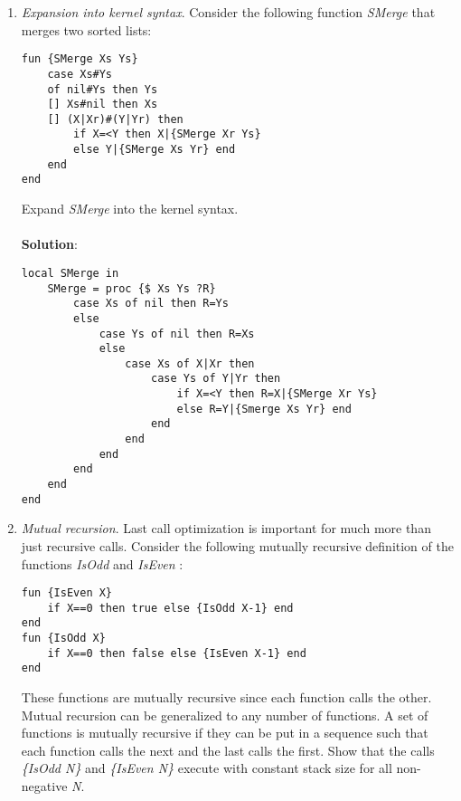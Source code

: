 \documentclass[11pt]{article}
\begin{document}
\begin{enumerate}
(c)
\\\\
\{Sum1 100000000\}: \\ stack grows with every recursive call, will exhaust allowed memory

\{Sum2 100000000 0\}: \\ tail recursion, constant stack, will return result

\item {\itshape Expansion into kernel syntax}. Consider the following function {\itshape SMerge} that
merges two sorted lists:
\begin{verbatim}
fun {SMerge Xs Ys}
    case Xs#Ys
    of nil#Ys then Ys
    [] Xs#nil then Xs
    [] (X|Xr)#(Y|Yr) then
        if X=<Y then X|{SMerge Xr Ys}
        else Y|{SMerge Xs Yr} end
    end
end        
\end{verbatim}
Expand {\itshape SMerge} into the kernel syntax.
\\\\
{\bfseries Solution}:
\begin{verbatim}
local SMerge in
    SMerge = proc {$ Xs Ys ?R}
        case Xs of nil then R=Ys
        else
            case Ys of nil then R=Xs
            else
                case Xs of X|Xr then
                    case Ys of Y|Yr then
                        if X=<Y then R=X|{SMerge Xr Ys}
                        else R=Y|{Smerge Xs Yr} end
                    end
                end
            end
        end
    end    
end                
\end{verbatim}

\item {\itshape Mutual recursion}. Last call optimization is important for much more than just
recursive calls. Consider the following mutually recursive deﬁnition of the functions
{\itshape IsOdd} and {\itshape IsEven} :
\begin{verbatim}
fun {IsEven X}
    if X==0 then true else {IsOdd X-1} end
end    
fun {IsOdd X} 
    if X==0 then false else {IsEven X-1} end
end
\end{verbatim}
These functions are mutually recursive since each function calls the
other. Mutual recursion can be generalized to any number of functions. A set of
functions is mutually recursive if they can be put in a sequence such that each
function calls the next and the last calls the ﬁrst. Show that
the calls {\itshape \{IsOdd N\}} and {\itshape \{IsEven N\}} execute with constant 
stack size for all non-negative {\itshape N}.


\end{enumerate}
\end{document}
